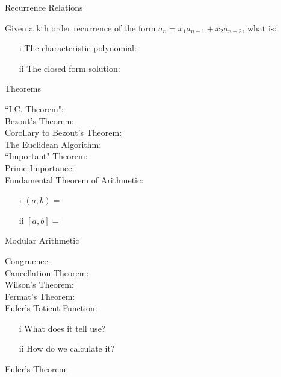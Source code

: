 \documentclass[12pt]{article}
\def \no{\noindent}
\begin{document}
\begin{center} Recurrence Relations \end{center}

\no Given a kth order recurrence of the form $a_n=x_1a_{n-1}+x_2a_{n-2}$, what is:\\
\begin{itemize}
	\item[i] The characteristic polynomial:
	\item[ii] The closed form solution:
\end{itemize}

\begin{center} Theorems \end{center}

\no  ``I.C. Theorem":\\

\no  Bezout's Theorem:\\

\no Corollary to Bezout's Theorem:\\

\no The Euclidean Algorithm:\\

\no  ``Important" Theorem:\\

\no  Prime Importance:\\

\no  Fundamental Theorem of Arithmetic:\\
\begin{itemize}
	\item[i] $ (a, b) = $
	\item[ii] $ [a,b] = $
\end{itemize}


\begin{center} Modular Arithmetic \end{center}


\no Congruence:\\

\no Cancellation Theorem:\\

\no Wilson's Theorem:\\

\no Fermat's Theorem:\\

\no Euler's Totient Function:\\
\begin{itemize}
	\item[i] What does it tell use?
	\item[ii] How do we calculate it?\\
\end{itemize}

\no Euler's Theorem:\\
\end{document}
